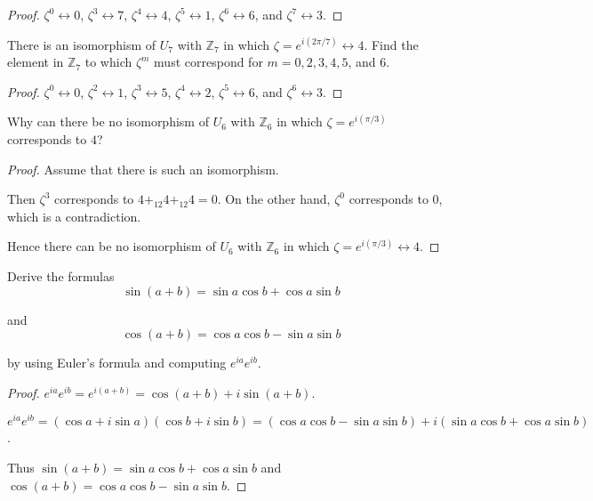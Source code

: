 \begin{proof}
    $\zeta^{0} \leftrightarrow 0$, $\zeta^{3} \leftrightarrow 7$, $\zeta^{4} \leftrightarrow 4$, $\zeta^{5}\leftrightarrow 1$, $\zeta^{6}\leftrightarrow 6$, and $\zeta^{7}\leftrightarrow 3$.
\end{proof}

\newpage
\begin{exercise}
    There is an isomorphism of $U_{7}$ with $\mathbb{Z}_{7}$ in which $\zeta = e^{i(2\pi/7)}\leftrightarrow 4$. Find the element in $\mathbb{Z}_{7}$ to which $\zeta^{m}$ must correspond for $m = 0, 2, 3, 4, 5$, and $6$.
\end{exercise}

\begin{proof}
    $\zeta^{0} \leftrightarrow 0$, $\zeta^{2} \leftrightarrow 1$, $\zeta^{3} \leftrightarrow 5$, $\zeta^{4} \leftrightarrow 2$, $\zeta^{5} \leftrightarrow 6$, and $\zeta^{6} \leftrightarrow 3$.
\end{proof}

\newpage
\begin{exercise}
    Why can there be no isomorphism of $U_{6}$ with $\mathbb{Z}_{6}$ in which $\zeta = e^{i(\pi/3)}$ corresponds to $4$?
\end{exercise}

\begin{proof}
    Assume that there is such an isomorphism.

    Then $\zeta^{3}$ corresponds to $4 {+}_{12} 4 {+}_{12} 4 = 0$. On the other hand, $\zeta^{0}$ corresponds to $0$, which is a contradiction.

    Hence there can be no isomorphism of $U_{6}$ with $\mathbb{Z}_{6}$ in which $\zeta = e^{i(\pi/3)}\leftrightarrow 4$.
\end{proof}

\newpage
\begin{exercise}
    Derive the formulas
    \[
        \sin(a + b) = \sin a\cos b + \cos a\sin b
    \]

    and
    \[
        \cos(a + b) = \cos a\cos b - \sin a\sin b
    \]

    by using Euler's formula and computing $e^{ia}e^{ib}$.
\end{exercise}

\begin{proof}
    $e^{ia}e^{ib} = e^{i(a+b)} = \cos(a+b) + i\sin(a+b)$.

    $e^{ia}e^{ib} = (\cos a + i\sin a)(\cos b + i\sin b) = (\cos a\cos b - \sin a\sin b) + i(\sin a\cos b + \cos a\sin b)$.

    Thus $\sin(a + b) = \sin a\cos b + \cos a\sin b$ and $\cos(a + b) = \cos a\cos b - \sin a\sin b$.
\end{proof}

